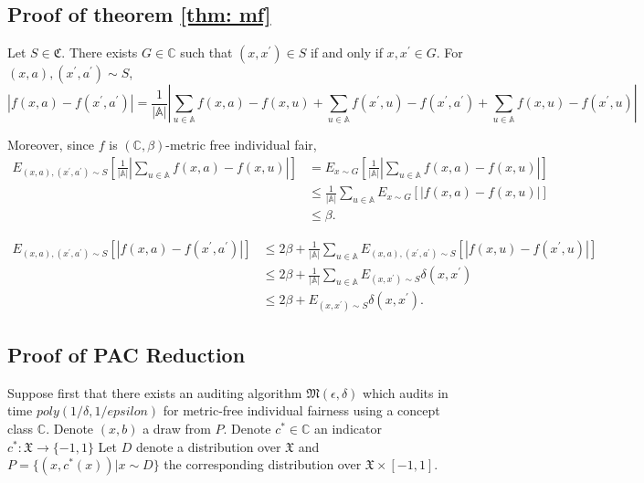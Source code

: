 \documentclass{article}
\begin{document}
\subsection{Proof of theorem \ref{thm: mf}}
Let $S\in \mathfrak{C}$. There exists $G\in \mathbb{C}$ such that $(x,x^{'})\in S$ if and only if $x, x^{'}\in G$. For $(x,a), (x^{'}, a^{'})\sim S$, 
\begin{equation}
    \left|f(x,a) - f(x^{'}, a^{'})\right| = \frac{1}{|\mathbb{A}|}\left|\displaystyle\sum_{u\in \mathbb{A}} f(x,a) - f(x,u) + \displaystyle\sum_{u\in \mathbb{A}} f(x^{'},u) - f(x^{'},a^{'}) + \displaystyle\sum_{u\in \mathbb{A}} f(x,u) - f(x^{'},u)\right|
\end{equation}

Moreover, since $f$ is $(\mathbb{C}, \beta)$-metric free individual fair,
\begin{equation}
\begin{split}
    E_{(x,a), (x^{'}, a^{'})\sim S}\left[\frac{1}{|\mathbb{A}|}\left|\displaystyle\sum_{u\in \mathbb{A}} f(x,a) - f(x,u)\right|\right] &= E_{x\sim G}\left[\frac{1}{|\mathbb{A}|}\left|\displaystyle\sum_{u\in \mathbb{A}} f(x,a) - f(x,u)\right|\right] \\
    & \leq \frac{1}{|\mathbb{A}|}\displaystyle\sum_{u\in \mathbb{A}} E_{x\sim G} \left[\left |f(x,a) - f(x,u)\right|\right] \\
    & \leq \beta.
    \end{split}
\end{equation}

\begin{equation}
\begin{split}
    E_{(x,a), (x^{'}, a^{'})\sim S}\left[|f(x,a) -f(x^{'}, a^{'})|\right]&\leq 2\beta +  \frac{1}{|\mathbb{A}|}\displaystyle\sum_{u\in \mathbb{A}}E_{(x,a), (x^{'}, a^{'})\sim S}\left[\left|  f(x,u) - f(x^{'},u)\right|\right]\\
    & \leq 2\beta + \frac{1}{|\mathbb{A}|}\displaystyle\sum_{u\in \mathbb{A}}E_{(x, x^{'})\sim S}\delta(x, x^{'}) \\
    & \leq 2\beta + E_{(x, x^{'})\sim S}\delta(x, x^{'}).
    \end{split}
\end{equation}

\subsection{Proof of PAC Reduction}

Suppose first that there exists an auditing algorithm $\mathfrak{M}(\epsilon, \delta)$ which audits in time $poly(1/\delta, 1/epsilon)$ for metric-free individual fairness using a concept class $\mathbb{C}$. Denote $(x, b)$ a draw from $P$. Denote $c^{*}\in \mathbb{C}$ an indicator $c^{*}: \mathfrak{X} \rightarrow \{-1,1\}$ Let $D$ denote a distribution over $\mathfrak{X}$ and $P=\{(x, c^{*}(x))| x\sim D\}$ the corresponding distribution over $\mathfrak{X}\times [-1,1]$. 
\end{document}
